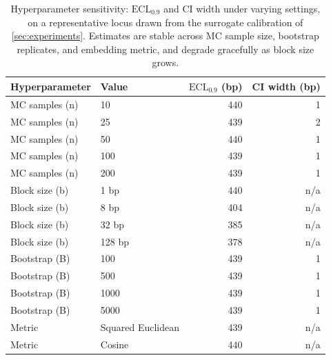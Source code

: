 \begin{table}[t]
\centering
\caption{Hyperparameter sensitivity: $\mathrm{ECL}_{0.9}$ and CI width under varying settings, on a representative locus drawn from the surrogate calibration of \cref{sec:experiments}. Estimates are stable across MC sample size, bootstrap replicates, and embedding metric, and degrade gracefully as block size grows.}
\label{tab:hyperparameter_sensitivity}
\begin{tabular}{llrr}
\toprule
\textbf{Hyperparameter} & \textbf{Value} & $\mathrm{ECL}_{0.9}$ (bp) & CI width (bp) \\
\midrule
MC samples (n) & 10 & 440 & 1 \\
MC samples (n) & 25 & 439 & 2 \\
MC samples (n) & 50 & 440 & 1 \\
MC samples (n) & 100 & 439 & 1 \\
MC samples (n) & 200 & 439 & 1 \\
\midrule
Block size (b) & 1 bp & 440 & n/a \\
Block size (b) & 8 bp & 404 & n/a \\
Block size (b) & 32 bp & 385 & n/a \\
Block size (b) & 128 bp & 378 & n/a \\
\midrule
Bootstrap (B) & 100 & 439 & 1 \\
Bootstrap (B) & 500 & 439 & 1 \\
Bootstrap (B) & 1000 & 439 & 1 \\
Bootstrap (B) & 5000 & 439 & 1 \\
\midrule
Metric & Squared Euclidean & 439 & n/a \\
Metric & Cosine & 440 & n/a \\
\bottomrule
\end{tabular}
\end{table}
